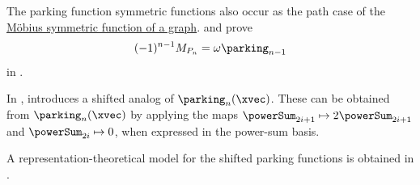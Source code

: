 The parking function symmetric functions also occur as the path case of the
\hyperref[mobiusSymmetricFunction]{Möbius symmetric function of a graph}.
 and  prove
\[
  (-1)^{n-1}M_{P_n}=\omega\parking_{n-1}
\]
in \cite{DLeonWachs2026x}.


In \cite{Stanley2024x},  introduces a shifted analog of $\parking_n(\xvec)$.
These can be obtained from $\parking_n(\xvec)$ by applying the maps
$\powerSum_{2i+1} \mapsto 2 \powerSum_{2i+1}$ and $\powerSum_{2i}\mapsto 0$,
when expressed in the power-sum basis.

A representation-theoretical model for the shifted parking functions is obtained in \cite{HamakerKim2025x}.

